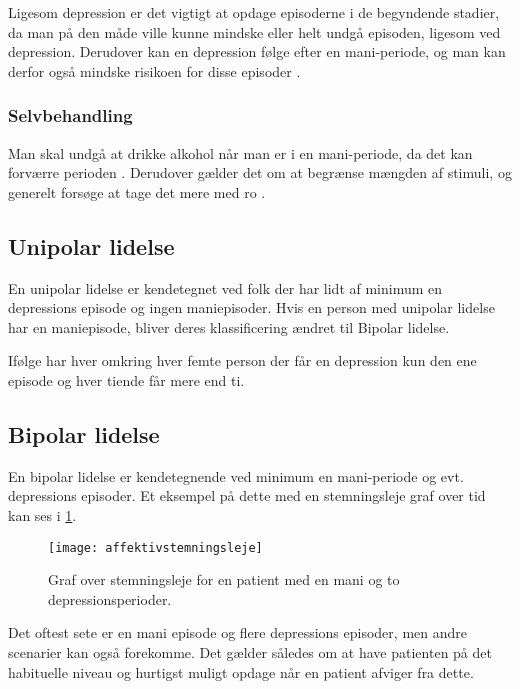 Ligesom depression er det vigtigt at opdage episoderne i de begyndende stadier, da man på den måde ville kunne mindske eller helt undgå episoden, ligesom ved depression.
Derudover kan en depression følge efter en mani-periode, og man kan derfor også mindske risikoen for disse episoder \citep{misc:bipolarsundhed}.

\subsubsection{Selvbehandling}
Man skal undgå at drikke alkohol når man er i en mani-periode, da det kan forværre perioden \citep{misc:netpsykmani}.
Derudover gælder det om at begrænse mængden af stimuli, og generelt forsøge at tage det mere med ro \citep{misc:janne-rasmussen}.

\subsection{Unipolar lidelse}
En unipolar lidelse er kendetegnet ved folk der har lidt af minimum en depressions episode og ingen maniepisoder.
Hvis en person med unipolar lidelse har en maniepisode, bliver deres klassificering ændret til Bipolar lidelse.

Ifølge \citet{misc:netpsykdepression} har hver omkring hver femte person der får en depression kun den ene episode og hver tiende får mere end ti.

\subsection{Bipolar lidelse}
En bipolar lidelse er kendetegnende ved minimum en mani-periode og evt. depressions episoder.
Et eksempel på dette med en stemningsleje graf over tid kan ses i \cref{fig:stemningslejegrafeksempel}.

\begin{figure}
	\centering
	\texttt{[image: affektivstemningsleje]}
	\caption{Graf over stemningsleje for en patient med en mani og to depressionsperioder.}\label{fig:stemningslejegrafeksempel}
\end{figure}

Det oftest sete er en mani episode og flere depressions episoder, men andre scenarier kan også forekomme.
Det gælder således om at have patienten på det habituelle niveau og hurtigst muligt opdage når en patient afviger fra dette.